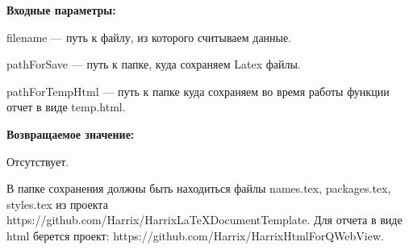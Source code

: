 \textbf{Входные параметры:}

filename --- путь к файлу, из которого считываем данные.
 
    pathForSave --- путь к папке, куда сохраняем Latex файлы.
 
    pathForTempHtml --- путь к папке куда сохраняем во время работы функции отчет в виде temp.html.

\textbf{Возвращаемое значение:}

Отсутствует.

В папке сохранения должны быть находиться файлы names.tex, packages.tex, styles.tex из проекта https://github.com/Harrix/HarrixLaTeXDocumentTemplate. Для отчета в виде html берется проект: https://github.com/Harrix/HarrixHtmlForQWebView.